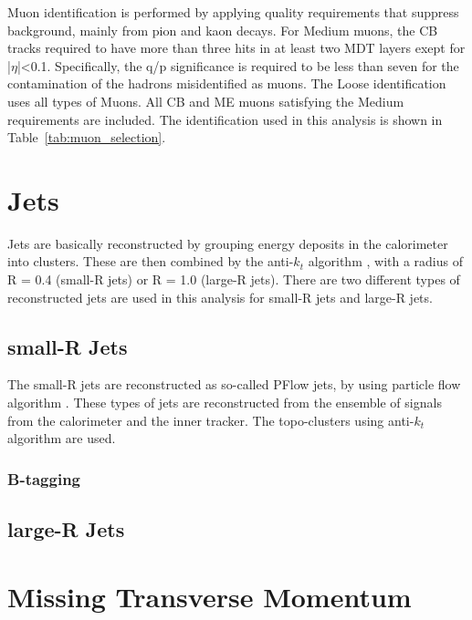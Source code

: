 Muon identification is performed by applying quality requirements that suppress background, mainly from pion and kaon decays. 
For Medium muons, the CB tracks required to have more than three hits in at least two MDT layers exept for |$\eta$|<0.1.
Specifically, the q/p significance is required to be less than seven for the contamination of the hadrons misidentified as muons.
The Loose identification uses all types of Muons. All CB and ME muons satisfying the Medium requirements are included. 
The identification used in this analysis is shown in Table~\ref{tab:muon_selection}.
\begin{table}[ht]
 \label{tab:muon_selection}
 \caption{Summary of muon selection used in this analysis}
\end{table}

\section{Jets}
Jets are basically reconstructed by grouping energy deposits in the calorimeter into clusters. These are then combined by the anti-$k_t$ algorithm \cite{Cacciari_2008}, with a radius of R = 0.4 (small-R jets) or R = 1.0 (large-R jets). 
There are two different types of reconstructed jets are used in this analysis for small-R jets and large-R jets.
\subsection{small-R Jets}
The small-R jets are reconstructed as so-called PFlow jets, by using particle flow algorithm \cite{PERF-2015-09}. These types of jets are reconstructed from the ensemble of signals from the calorimeter and the inner tracker. The topo-clusters using anti-$k_t$ algorithm are used.
\subsubsection{B-tagging}

\subsection{large-R Jets}
\section{Missing Transverse Momentum}


